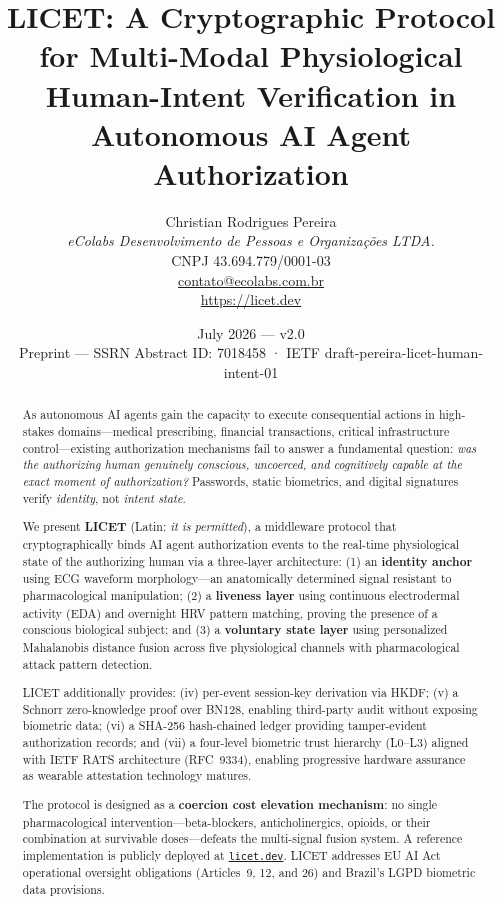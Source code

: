 \documentclass[12pt,a4paper]{article}
\title{\textbf{LICET: A Cryptographic Protocol for Multi-Modal Physiological\\
Human-Intent Verification in Autonomous AI Agent Authorization}}
\author{
  Christian Rodrigues Pereira\\
  \textit{eColabs Desenvolvimento de Pessoas e Organizações LTDA.}\\
  CNPJ 43.694.779/0001-03\\
  \href{mailto:contato@ecolabs.com.br}{contato@ecolabs.com.br}\\
  \href{https://licet.dev}{https://licet.dev}
}
\date{July 2026 — v2.0\\[0.5em]
\small Preprint — SSRN Abstract ID: 7018458 · IETF draft-pereira-licet-human-intent-01}
\begin{document}
\maketitle

\begin{abstract}
As autonomous AI agents gain the capacity to execute consequential actions in
high-stakes domains—medical prescribing, financial transactions, critical
infrastructure control—existing authorization mechanisms fail to answer a
fundamental question: \textit{was the authorizing human genuinely conscious,
uncoerced, and cognitively capable at the exact moment of authorization?}
Passwords, static biometrics, and digital signatures verify \emph{identity},
not \emph{intent state}.

We present \textbf{LICET} (Latin: \textit{it is permitted}), a middleware
protocol that cryptographically binds AI agent authorization events to the
real-time physiological state of the authorizing human via a three-layer
architecture: (1) an \textbf{identity anchor} using ECG waveform morphology—an
anatomically determined signal resistant to pharmacological manipulation; (2) a
\textbf{liveness layer} using continuous electrodermal activity (EDA) and
overnight HRV pattern matching, proving the presence of a conscious biological
subject; and (3) a \textbf{voluntary state layer} using personalized Mahalanobis
distance fusion across five physiological channels with pharmacological attack
pattern detection.

LICET additionally provides: (iv) per-event session-key derivation via HKDF;
(v) a Schnorr zero-knowledge proof over BN128, enabling third-party audit without
exposing biometric data; (vi) a SHA-256 hash-chained ledger providing
tamper-evident authorization records; and (vii) a four-level biometric trust
hierarchy (L0--L3) aligned with IETF RATS architecture (RFC~9334), enabling
progressive hardware assurance as wearable attestation technology matures.

The protocol is designed as a \textbf{coercion cost elevation mechanism}: no
single pharmacological intervention—beta-blockers, anticholinergics, opioids, or
their combination at survivable doses—defeats the multi-signal fusion system. A
reference implementation is publicly deployed at
\href{https://licet.dev}{\texttt{licet.dev}}. LICET addresses EU AI Act
operational oversight obligations (Articles~9, 12, and 26) and Brazil's LGPD
biometric data provisions.
\end{abstract}
\end{document}
